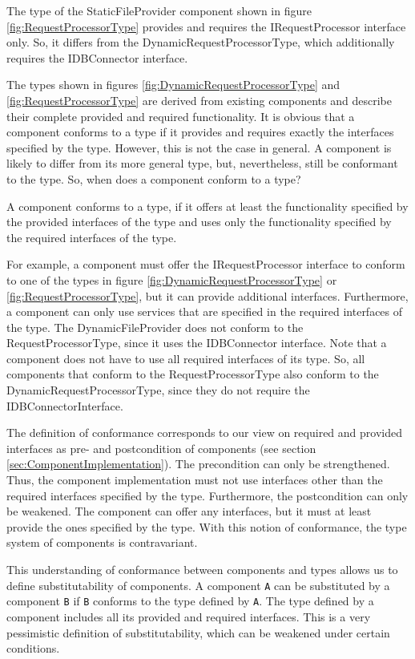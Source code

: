 The type of the StaticFileProvider component shown in figure \ref{fig:RequestProcessorType} provides and requires the IRequestProcessor interface only. So, it differs from the DynamicRequestProcessorType, which additionally requires the IDBConnector interface. 

The types shown in figures \ref{fig:DynamicRequestProcessorType} and \ref{fig:RequestProcessorType} are derived from existing components and describe their complete provided and required functionality.
It is obvious that a component conforms to a type if it provides and requires exactly the interfaces specified by the type. However, this is not the case in general. A component is likely to differ from its more general type, but, nevertheless, still be conformant to the type. So, when does a component conform to a type?

A component conforms to a type, if it offers at least the functionality specified by the provided interfaces of the type and uses only the functionality specified by the required interfaces of the type.

For example, a component must offer the IRequestProcessor interface to conform to one of the types in figure \ref{fig:DynamicRequestProcessorType} or \ref{fig:RequestProcessorType}, but it can provide additional interfaces.
Furthermore, a component can only use services that are specified in the required interfaces of the type. The DynamicFileProvider does not conform to the RequestProcessorType, since it uses the IDBConnector interface. Note that a component does not have to use all required interfaces of its type. So, all components that conform to the RequestProcessorType also conform to the DynamicRequestProcessorType, since they do not require the IDBConnectorInterface. 

The definition of conformance corresponds to our view on required and provided interfaces as pre- and postcondition of components (see section \ref{sec:ComponentImplementation}). The precondition can only be strengthened. Thus, the component implementation must not use interfaces other than the required interfaces specified by the type. Furthermore, the postcondition can only be weakened. The component can offer any interfaces, but it must at least provide the ones specified by the type. With this notion of conformance, the type system of components is contravariant.

This understanding of conformance between components and types allows us to define substitutability of components. A component \texttt{A} can be substituted by a component \texttt{B} if \texttt{B} conforms to the type defined by \texttt{A}. The type defined by a component includes all its provided and required interfaces. This is a very pessimistic definition of substitutability, which can be weakened under certain conditions. 

